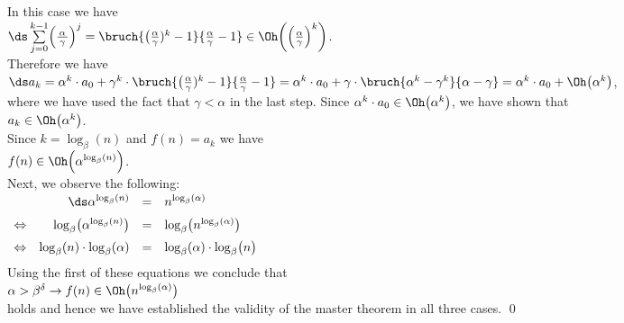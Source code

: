 \begin{enumerate}
      In this case we have
      \\[0.2cm]
      \hspace*{1.3cm}
      $\ds\sum\limits_{j=0}^{k-1} \Bigl(\frac{\,\alpha\,}{\gamma}\Bigr)^j = \bruch{\bigl(\frac{\alpha}{\gamma})^k - 1}{\frac{\alpha}{\gamma} - 1} \in \Oh\biggl(\Bigl(\frac{\alpha}{\gamma}\Bigr)^k\biggr)$.
      \\[0.2cm]
      Therefore we have
      \\[0.2cm]
      \hspace*{1.3cm}
      $\ds a_k = \alpha^k\cdot a_0 + \gamma^k \cdot \bruch{\bigl(\frac{\alpha}{\gamma})^k - 1}{\frac{\alpha}{\gamma} - 1} =
                   \alpha^k\cdot a_0 + \gamma \cdot \bruch{\alpha^k -\gamma^k}{\alpha - \gamma} =
                   \alpha^k\cdot a_0 + \Oh\bigl(\alpha^k\bigr)
      $,
      \\[0.2cm] 
      where we have used the fact that $\gamma < \alpha$ in the last step.
      Since $\alpha^k \cdot a_0 \in \Oh\bigl(\alpha^k\bigr)$, we have shown that
      \\[0.2cm]
      \hspace*{1.3cm}
      $a_k \in  \Oh\bigl(\alpha^k\bigr)$.
      \\[0.2cm]
      Since  $k = \log_{\beta}(n)$ and $f(n) = a_k$ we have
      \\[0.2cm]
      \hspace*{1.3cm}
      $f(n) \in \Oh\Bigl(\alpha^{\log_{\beta}(n)}\Bigr)$.
      \\[0.2cm] 
      Next, we observe the following:
      \\[0.2cm]
      \hspace*{1.3cm}
      $
      \begin{array}[t]{lrcl}
                        & \ds\alpha^{\log_{\beta}(n)} & = & n^{\log_{\beta}(\alpha)} \\[0.2cm]
        \Leftrightarrow & \log_\beta\bigl(\alpha^{\log_{\beta}(n)}\bigr) & = & \log_{\beta}\bigl(n^{\log_{\beta}(\alpha)}\bigr) \\[0.2cm]
        \Leftrightarrow & \log_{\beta}(n) \cdot \log_\beta(\alpha) & = & \log_{\beta}(\alpha) \cdot \log_{\beta}\bigl(n\bigr) \\[0.2cm]      
      \end{array}
      $
      \\[0.2cm]
      Using the first of these equations we conclude that
      \\[0.2cm]
      \hspace*{1.3cm}
      $\alpha > \beta^\delta \rightarrow f(n) \in \Oh\bigl(n^{\log_{\beta}(\alpha)}\bigr)$
      \\[0.2cm]
      holds and hence we have established the validity of the master theorem in all three cases.  
      \qed
\end{enumerate}

